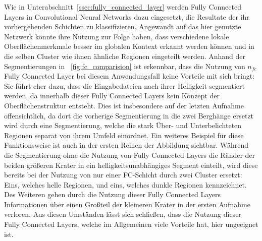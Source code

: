 Wie in Unterabschnitt~\ref{ssec:fully_connected_layer} werden Fully Connected Layers in Convolutional Neural Networks dazu eingesetzt, die Resultate der ihr vorhergehenden Schichten zu klassifizieren. Angewandt auf das hier genutzte Netzwerk könnte ihre Nutzung zur Folge haben, dass verschiedene lokale Oberflächenmerkmale besser im globalen Kontext erkannt werden können und \ggf in die selben Cluster wie ihnen ähnliche Regionen eingeteilt werden. Anhand der Segmentierungen in \figurename~\ref{fig:fc_comparision} ist erkennbar, dass die Nutzung von $n_{fc}$ Fully Connected Layer bei diesem Anwendungsfall keine Vorteile mit sich bringt: Sie führt eher dazu, dass die Eingabedateien nach ihrer Helligkeit segmentiert werden, da innerhalb dieser Fully Connected Layers kein Konzept der Oberflächenstruktur entsteht. Dies ist insbesondere auf der letzten Aufnahme offensichtlich, da dort die vorherige Segmentierung in die zwei Berghänge ersetzt wird durch eine Segmentierung, welche die stark Über- und Unterbelichteten Regionen separat von ihrem Umfeld einordnet. Ein weiteres Beispiel für diese Funktionsweise ist auch in der ersten Reihen der Abbildung sichtbar. Während die Segmentierung ohne die Nutzung von Fully Connected Layers die Ränder der beiden größeren Krater in ein helligkeitsunabhängiges Segment einteilt, wird diese bereits bei der Nutzung von nur einer FC-Schicht durch zwei Cluster ersetzt: Eins, welches helle Regionen, und eins, welches dunkle Regionen kennzeichnet. Des Weiteren gehen durch die Nutzung dieser Fully Connected Layers Informationen über einen Großteil der kleineren Krater in der ersten Aufnahme verloren.
Aus diesen Umständen lässt sich schließen, dass die Nutzung dieser Fully Connected Layers, welche im Allgemeinen viele Vorteile hat, hier ungeeignet ist.

